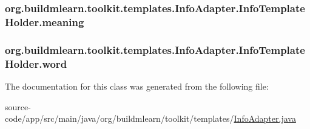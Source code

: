 \subsubsection[{\texorpdfstring{meaning}{meaning}}]{ org.\+buildmlearn.\+toolkit.\+templates.\+Info\+Adapter.\+Info\+Template\+Holder.\+meaning}\hypertarget{classorg_1_1buildmlearn_1_1toolkit_1_1templates_1_1InfoAdapter_1_1InfoTemplateHolder_a50883106775afa0b300bfad56a609dc0}{}\label{classorg_1_1buildmlearn_1_1toolkit_1_1templates_1_1InfoAdapter_1_1InfoTemplateHolder_a50883106775afa0b300bfad56a609dc0}
\subsubsection[{\texorpdfstring{word}{word}}]{ org.\+buildmlearn.\+toolkit.\+templates.\+Info\+Adapter.\+Info\+Template\+Holder.\+word}\hypertarget{classorg_1_1buildmlearn_1_1toolkit_1_1templates_1_1InfoAdapter_1_1InfoTemplateHolder_a0391d141913c5ab231c1b22cc0c32a55}{}\label{classorg_1_1buildmlearn_1_1toolkit_1_1templates_1_1InfoAdapter_1_1InfoTemplateHolder_a0391d141913c5ab231c1b22cc0c32a55}


The documentation for this class was generated from the following file\+:\begin{DoxyCompactItemize}
\item 
source-\/code/app/src/main/java/org/buildmlearn/toolkit/templates/\hyperlink{InfoAdapter_8java}{Info\+Adapter.\+java}\end{DoxyCompactItemize}
